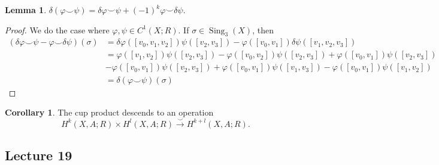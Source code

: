 \documentclass[10pt,letterpaper,cm]{nupset}
\theoremstyle{definition}
\theoremstyle{theorem}
\newtheorem{lemma}[definition]{Lemma}
\newtheorem{corollary}[definition]{Corollary}
\theoremstyle{remark}
\newcommand{\1}{\mathbb{1}}
\newcommand{\0}{\vec 0}
\DeclareMathOperator{\sing}{Sing}
\begin{document}
\begin{lemma}
$\delta(\varphi \smile \psi) = \delta{\varphi} \smile \psi + ({-}1)^k \varphi \smile \delta{\psi}$.
\end{lemma}
\begin{proof}
We do the case where $\varphi, \psi \in C^1(X;R)$. If $\sigma \in \sing_3(X)$, then
\begin{align*}
 (\delta{\varphi} \smile \psi - \varphi \smile \delta{\psi})(\sigma) & =   \delta{\varphi}([v_0, v_1, v_2])\psi([v_2, v_3]) -  \varphi([v_0, v_1])\delta{\psi}([v_1, v_2, v_3])
 \\ & =  \varphi([v_1, v_2])\psi([v_2, v_3]) - \varphi([v_0, v_2])\psi([v_2, v_3])  + \varphi([v_0, v_1])\psi([v_2, v_3]) 
 \\ & - \varphi([v_0, v_1])\psi([v_2, v_3]) + \varphi([v_0, v_1])\psi([v_1, v_3]) - \varphi([v_0, v_1])\psi([v_1, v_2])  
 \\ & = \delta(\varphi \smile \psi)(\sigma)
\end{align*}
\end{proof}

\begin{corollary}
The cup product descends to an operation $$ H^k(X, A;R) \times H^l(X,A;R) \overset{\smile}{\longrightarrow} H^{k+l}(X,A; R)     .$$
\end{corollary}

\subsection{Lecture 19}
\end{document}
